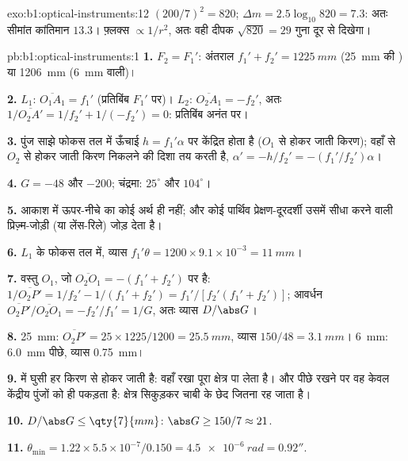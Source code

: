 \begin{solution}{exo:b1:optical-instruments:12}
$(200/7)^2 = 820$; $\Delta m = 2.5\log_{10}820 = 7.3$: अतः सीमांत
कांतिमान $13.3$। फ़्लक्स $\propto 1/r^2$, अतः वही दीपक
$\sqrt{820} = 29$ गुना दूर से दिखेगा।
\end{solution}

\begin{solution}{pb:b1:optical-instruments:1}
\textbf{1.} $F_2 = F_1'$: अंतराल $f_1' + f_2' = \qty{1225}{mm}$
(\qty{25}{mm} की ) या \qty{1206}{mm} (\qty{6}{mm} वाली)।

\textbf{2.} $L_1$: $\overline{O_1A_1} = f_1'$ (प्रतिबिंब $F_1'$ पर)। $L_2$:
$\overline{O_2A_1} = -f_2'$, अतः $1/\overline{O_2A'} = 1/f_2' + 1/(-f_2')
= 0$: प्रतिबिंब अनंत पर।

\textbf{3.} पुंज साझे फोकस तल में ऊँचाई $h =
f_1'\alpha$ पर केंद्रित होता है ($O_1$ से होकर जाती किरण); वहाँ से $O_2$ से
होकर जाती किरण निकलने की दिशा तय करती है, $\alpha' = -h/f_2' = -(f_1'/f_2')\alpha$।

\textbf{4.} $G = -48$ और $-200$; चंद्रमा: $25^\circ$ और $104^\circ$।

\textbf{5.} आकाश में ऊपर-नीचे का कोई अर्थ ही नहीं; और कोई पार्थिव
प्रेक्षण-दूरदर्शी उसमें सीधा करने वाली प्रिज़्म-जोड़ी (या लेंस-रिले) जोड़ देता है।

\textbf{6.} $L_1$ के फोकस तल में, व्यास $f_1'\theta = 1200 \times
9.1\times10^{-3} = \qty{11}{mm}$।

\textbf{7.} वस्तु $O_1$, जो $\overline{O_2O_1} = -(f_1' + f_2')$ पर है:
$1/\overline{O_2P'} = 1/f_2' - 1/(f_1' + f_2') = f_1'/[f_2'(f_1' + f_2')]$;
आवर्धन $\overline{O_2P'}/\overline{O_2O_1} = -f_2'/f_1' = 1/G$,
अतः व्यास $D/\abs G$।

\textbf{8.} \qty{25}{mm}: $\overline{O_2P'} = 25 \times 1225/1200 =
\qty{25.5}{mm}$, व्यास $150/48 = \qty{3.1}{mm}$। \qty{6}{mm}:
\qty{6.0}{mm} पीछे, व्यास \qty{0.75}{mm}।

\textbf{9.}  में घुसी हर किरण  से होकर जाती है: वहाँ रखा
 पूरा क्षेत्र पा लेता है। और पीछे रखने पर वह केवल केंद्रीय पुंजों को ही
पकड़ता है: क्षेत्र सिकुड़कर चाबी के छेद जितना रह जाता है।

\textbf{10.} $D/\abs G \leq \qty{7}{mm}$: $\abs G \geq 150/7 \approx 21$.

\textbf{11.} $\theta_{\min} = 1.22 \times 5.5\times10^{-7}/0.150 =
\qty{4.5e-6}{rad} = 0.92''$.


\end{solution}
